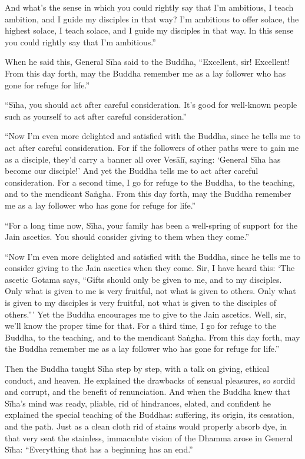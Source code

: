 \documentclass[12pt,openany]{book}%
\begin{document}
And what’s the sense in which you could rightly say that I’m ambitious, I teach ambition, and I guide my disciples in that way? I’m ambitious to offer solace, the highest solace, I teach solace, and I guide my disciples in that way. In this sense you could rightly say that I’m ambitious.” 

When he said this, General \textsanskrit{Sīha} said to the Buddha, “Excellent, sir! Excellent! From this day forth, may the Buddha remember me as a lay follower who has gone for refuge for life.” 

“\textsanskrit{Sīha}, you should act after careful consideration. It’s good for well-known people such as yourself to act after careful consideration.” 

“Now I’m even more delighted and satisfied with the Buddha, since he tells me to act after careful consideration. For if the followers of other paths were to gain me as a disciple, they’d carry a banner all over \textsanskrit{Vesālī}, saying: ‘General \textsanskrit{Sīha} has become our disciple!’ And yet the Buddha tells me to act after careful consideration. For a second time, I go for refuge to the Buddha, to the teaching, and to the mendicant \textsanskrit{Saṅgha}. From this day forth, may the Buddha remember me as a lay follower who has gone for refuge for life.” 

“For a long time now, \textsanskrit{Sīha}, your family has been a well-spring of support for the Jain ascetics. You should consider giving to them when they come.” 

“Now I’m even more delighted and satisfied with the Buddha, since he tells me to consider giving to the Jain ascetics when they come. Sir, I have heard this: ‘The ascetic Gotama says, “Gifts should only be given to me, and to my disciples. Only what is given to me is very fruitful, not what is given to others. Only what is given to my disciples is very fruitful, not what is given to the disciples of others.”’ Yet the Buddha encourages me to give to the Jain ascetics. Well, sir, we’ll know the proper time for that. For a third time, I go for refuge to the Buddha, to the teaching, and to the mendicant \textsanskrit{Saṅgha}. From this day forth, may the Buddha remember me as a lay follower who has gone for refuge for life.” 

Then the Buddha taught \textsanskrit{Sīha} step by step, with a talk on giving, ethical conduct, and heaven. He explained the drawbacks of sensual pleasures, so sordid and corrupt, and the benefit of renunciation. And when the Buddha knew that \textsanskrit{Sīha}’s mind was ready, pliable, rid of hindrances, elated, and confident he explained the special teaching of the Buddhas: suffering, its origin, its cessation, and the path. Just as a clean cloth rid of stains would properly absorb dye, in that very seat the stainless, immaculate vision of the Dhamma arose in General \textsanskrit{Sīha}: “Everything that has a beginning has an end.” 
\end{document}
